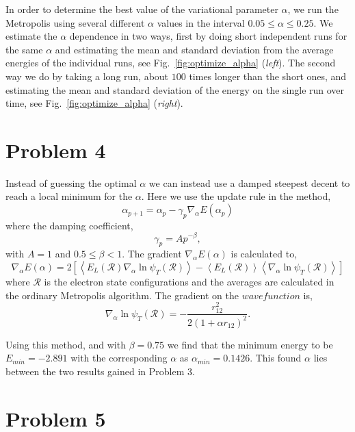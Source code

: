 In order to determine the best value of the variational parameter $\alpha$, we run the Metropolis using several different $\alpha$ values in the interval $0.05 \leq \alpha \leq 0.25$. We estimate the $\alpha$ dependence in two ways, first by doing short independent runs for the same $\alpha$ and estimating the mean and standard deviation from the average energies of the individual runs, see Fig.~\ref{fig:optimize_alpha} (\textit{left}). The second way we do by taking a long run, about $100$ times longer than the short ones, and estimating the mean and standard deviation of the energy on the single run over time, see Fig.~\ref{fig:optimize_alpha} (\textit{right}). 

\section*{Problem 4}

Instead of guessing the optimal $\alpha$ we can instead use a damped steepest decent to reach a local minimum for the $\alpha$. Here we use the update rule in the method,
\begin{equation}
\alpha_{p+1} = \alpha_p-\gamma_p \nabla_\alpha E(\alpha_p)
\end{equation} 
where the damping coefficient,
\begin{equation}
\gamma_p=Ap^{-\beta},
\end{equation}
with $A=1$ and $0.5\leq\beta < 1$. The gradient $\nabla_\alpha E(\alpha)$ is calculated to,
\begin{equation}
\nabla_\alpha E(\alpha) = 2\left[\left<E_L(\mathcal{R})\nabla_\alpha \ln{\psi_T(\mathcal{R})}\right>-\left<E_L(\mathcal{R})\right>\left<\nabla_\alpha\ln{\psi_T(\mathcal{R})}\right>\right]
\end{equation}
where $\mathcal{R}$ is the electron state configurations and the averages are calculated in the ordinary Metropolis algorithm. The gradient on the $wave function $ is,
\begin{equation}
\nabla_\alpha \ln{\psi_T(\mathcal{R})} = -\frac{r_{12}^2}{2(1+\alpha r_{12})^2}.
\end{equation}

Using this method, and with $\beta = 0.75$ we find that the minimum energy to be $E_{min}=-2.891$ with the corresponding $\alpha$ as $\alpha_{min}=0.1426$. This found $\alpha$ lies between the two results gained in Problem 3.


\section*{Problem 5}

